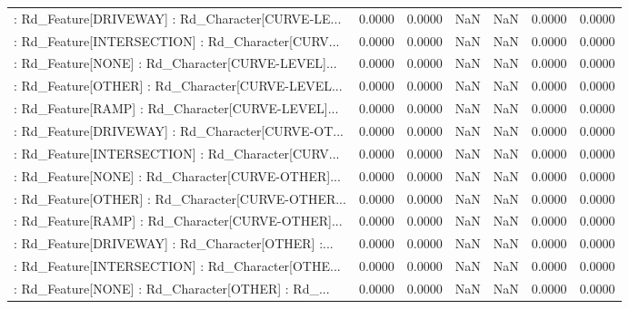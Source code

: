 \begin{longtable}{p{4cm}cccccc}
 : Rd\_Feature[DRIVEWAY] : Rd\_Character[CURVE-LE... &            0.0000 &            0.0000 &     NaN &          NaN &             0.0000 &            0.0000 \\
 : Rd\_Feature[INTERSECTION] : Rd\_Character[CURV... &            0.0000 &            0.0000 &     NaN &          NaN &             0.0000 &            0.0000 \\
 : Rd\_Feature[NONE] : Rd\_Character[CURVE-LEVEL]... &            0.0000 &            0.0000 &     NaN &          NaN &             0.0000 &            0.0000 \\
 : Rd\_Feature[OTHER] : Rd\_Character[CURVE-LEVEL... &            0.0000 &            0.0000 &     NaN &          NaN &             0.0000 &            0.0000 \\
 : Rd\_Feature[RAMP] : Rd\_Character[CURVE-LEVEL]... &            0.0000 &            0.0000 &     NaN &          NaN &             0.0000 &            0.0000 \\
 : Rd\_Feature[DRIVEWAY] : Rd\_Character[CURVE-OT... &            0.0000 &            0.0000 &     NaN &          NaN &             0.0000 &            0.0000 \\
 : Rd\_Feature[INTERSECTION] : Rd\_Character[CURV... &            0.0000 &            0.0000 &     NaN &          NaN &             0.0000 &            0.0000 \\
 : Rd\_Feature[NONE] : Rd\_Character[CURVE-OTHER]... &            0.0000 &            0.0000 &     NaN &          NaN &             0.0000 &            0.0000 \\
 : Rd\_Feature[OTHER] : Rd\_Character[CURVE-OTHER... &            0.0000 &            0.0000 &     NaN &          NaN &             0.0000 &            0.0000 \\
 : Rd\_Feature[RAMP] : Rd\_Character[CURVE-OTHER]... &            0.0000 &            0.0000 &     NaN &          NaN &             0.0000 &            0.0000 \\
 : Rd\_Feature[DRIVEWAY] : Rd\_Character[OTHER] :... &            0.0000 &            0.0000 &     NaN &          NaN &             0.0000 &            0.0000 \\
 : Rd\_Feature[INTERSECTION] : Rd\_Character[OTHE... &            0.0000 &            0.0000 &     NaN &          NaN &             0.0000 &            0.0000 \\
 : Rd\_Feature[NONE] : Rd\_Character[OTHER] : Rd\_... &            0.0000 &            0.0000 &     NaN &          NaN &             0.0000 &            0.0000 \\

\end{longtable}
